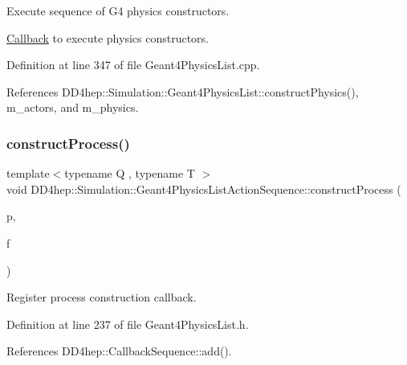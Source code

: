 Execute sequence of G4 physics constructors. 

\hyperlink{class_d_d4hep_1_1_callback}{Callback} to execute physics constructors. 

Definition at line 347 of file Geant4\+Physics\+List.\+cpp.



References D\+D4hep\+::\+Simulation\+::\+Geant4\+Physics\+List\+::construct\+Physics(), m\+\_\+actors, and m\+\_\+physics.

\hypertarget{class_d_d4hep_1_1_simulation_1_1_geant4_physics_list_action_sequence_a589bbee3287612e519fa1ebfac9a0492}{}\label{class_d_d4hep_1_1_simulation_1_1_geant4_physics_list_action_sequence_a589bbee3287612e519fa1ebfac9a0492} 
\subsubsection{\texorpdfstring{construct\+Process()}{constructProcess()}}
{\footnotesize\ttfamily template$<$typename Q , typename T $>$ \\
void D\+D4hep\+::\+Simulation\+::\+Geant4\+Physics\+List\+Action\+Sequence\+::construct\+Process (\begin{DoxyParamCaption}\item[{Q $\ast$}]{p,  }\item[{void(T\+::$\ast$)(G4\+V\+User\+Physics\+List $\ast$)}]{f }\end{DoxyParamCaption})\hspace{0.3cm}{\ttfamily [inline]}}



Register process construction callback. 



Definition at line 237 of file Geant4\+Physics\+List.\+h.



References D\+D4hep\+::\+Callback\+Sequence\+::add().

\hypertarget{class_d_d4hep_1_1_simulation_1_1_geant4_physics_list_action_sequence_a752ad9266718451f2a6b4906a395cbb7}{}\label{class_d_d4hep_1_1_simulation_1_1_geant4_physics_list_action_sequence_a752ad9266718451f2a6b4906a395cbb7} 
